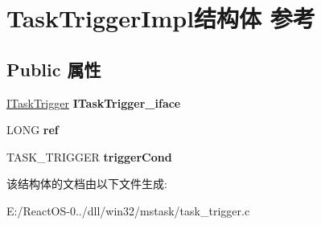 \hypertarget{struct_task_trigger_impl}{}\section{Task\+Trigger\+Impl结构体 参考}
\label{struct_task_trigger_impl}
\subsection*{Public 属性}
\begin{DoxyCompactItemize}
\item 
\mbox{\label{struct_task_trigger_impl_abc52cbd18298e8557570a31207c23a16}} 
\hyperlink{interface_i_task_trigger}{I\+Task\+Trigger} {\bfseries I\+Task\+Trigger\+\_\+iface}
\item 
\mbox{\label{struct_task_trigger_impl_a0cd371cc18a8e0a0c9f026f4fd7b3e1e}} 
L\+O\+NG {\bfseries ref}
\item 
\mbox{\label{struct_task_trigger_impl_a0c8a36d6e306828636df82968d4275f2}} 
T\+A\+S\+K\+\_\+\+T\+R\+I\+G\+G\+ER {\bfseries trigger\+Cond}
\end{DoxyCompactItemize}


该结构体的文档由以下文件生成\+:\begin{DoxyCompactItemize}
\item 
E\+:/\+React\+O\+S-\/0../dll/win32/mstask/task\+\_\+trigger.\+c\end{DoxyCompactItemize}

